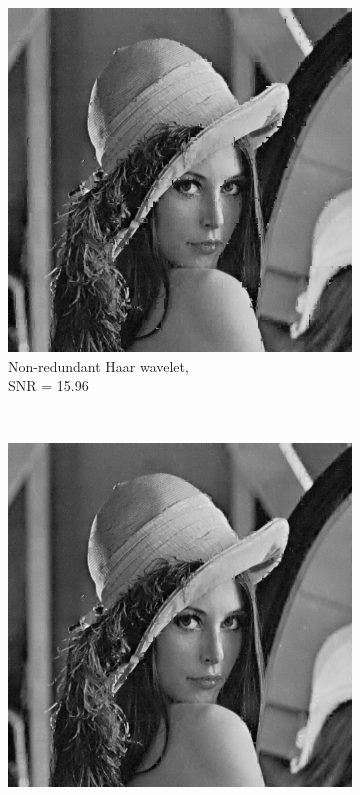 \begin{figure}
    \centering
    \begin{subfigure}[b]{0.4\textwidth}
        \includegraphics[width=\textwidth]{../src/inpainting/vraag_2_3_wt_haar}
        \caption{Non-redundant Haar wavelet, \\ SNR = 15.96 }
        \label{fig:matti_fig_wt_haar}
    \end{subfigure}
    ~ %
    \begin{subfigure}[b]{0.4\textwidth}
        \includegraphics[width=\textwidth]{../src/inpainting/vraag_2_3_rwt_haar}

\end{subfigure}
\end{figure}
